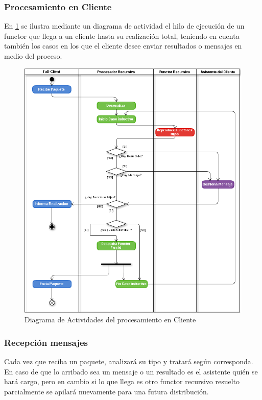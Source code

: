     \subsubsection{Procesamiento en Cliente}
    En \ref{activity2} se ilustra mediante un diagrama de actividad el hilo de ejecución de un functor que llega a un
    cliente hasta su realización total, teniendo en cuenta también los casos en los que el cliente desee enviar
    resultados o mensajes en medio del proceso.

        \begin{figure}[!ht]
            \begin{center}

            \includegraphics[scale=0.55]{images/ActivityRecAbs-2.png}
            \end{center}
            \caption{Diagrama de Actividades del procesamiento en Cliente}
            \label{activity2}
        \end{figure}


     \subsubsection{Recepción mensajes}
        Cada vez que \fud{} reciba un paquete, \rc{} analizará su tipo y tratará según corresponda. En caso de que
        lo arribado sea un mensaje o un resultado es el asistente quién se hará cargo, pero en cambio si lo que llega
        es otro functor recursivo resuelto parcialmente se apilará nuevamente para una futura distribución. 

